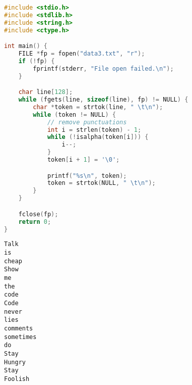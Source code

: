 
\begin{lstlisting}[language=C]
#include <stdio.h>
#include <stdlib.h>
#include <string.h>
#include <ctype.h>

int main() {
    FILE *fp = fopen("data3.txt", "r");
    if (!fp) {
        fprintf(stderr, "File open failed.\n");
    }

    char line[128];
    while (fgets(line, sizeof(line), fp) != NULL) {
        char *token = strtok(line, " \t\n");
        while (token != NULL) {
            // remove punctuations
            int i = strlen(token) - 1;
            while (!isalpha(token[i])) {
                i--;
            }
            token[i + 1] = '\0';

            printf("%s\n", token);
            token = strtok(NULL, " \t\n");
        }
    }

    fclose(fp);
    return 0;
}
\end{lstlisting}

\begin{tcolorbox}
    \begin{verbatim}
Talk
is
cheap
Show
me
the
code
Code
never
lies
comments
sometimes
do
Stay
Hungry
Stay
Foolish
	\end{verbatim}
\end{tcolorbox}

\newpage